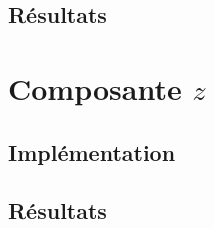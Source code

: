 \subsection{Résultats}

\section{Composante $z$}
\subsection{Implémentation}
\subsection{Résultats}



